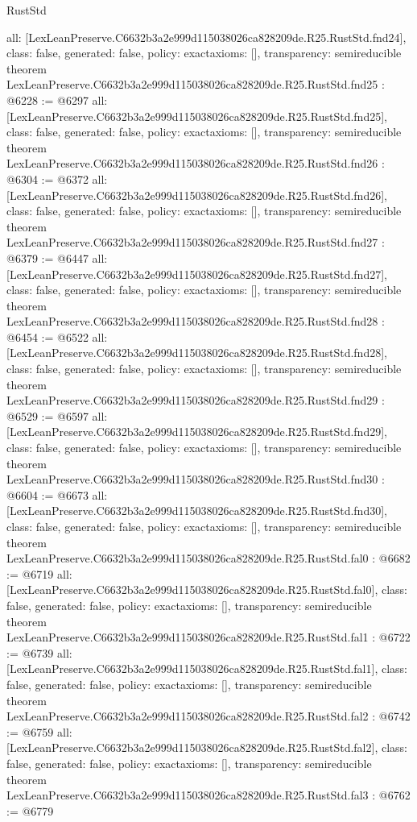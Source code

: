 \begin{lexlean}{RustStd}
\begin{coremodule}
{  all: [LexLeanPreserve.C6632b3a2e999d115038026ca828209de.R25.RustStd.fnd24],
  class: false,
  generated: false,
  policy: exact{axioms: []},
  transparency: semireducible
}
theorem LexLeanPreserve.C6632b3a2e999d115038026ca828209de.R25.RustStd.fnd25 : @6228 := @6297 {
  all: [LexLeanPreserve.C6632b3a2e999d115038026ca828209de.R25.RustStd.fnd25],
  class: false,
  generated: false,
  policy: exact{axioms: []},
  transparency: semireducible
}
theorem LexLeanPreserve.C6632b3a2e999d115038026ca828209de.R25.RustStd.fnd26 : @6304 := @6372 {
  all: [LexLeanPreserve.C6632b3a2e999d115038026ca828209de.R25.RustStd.fnd26],
  class: false,
  generated: false,
  policy: exact{axioms: []},
  transparency: semireducible
}
theorem LexLeanPreserve.C6632b3a2e999d115038026ca828209de.R25.RustStd.fnd27 : @6379 := @6447 {
  all: [LexLeanPreserve.C6632b3a2e999d115038026ca828209de.R25.RustStd.fnd27],
  class: false,
  generated: false,
  policy: exact{axioms: []},
  transparency: semireducible
}
theorem LexLeanPreserve.C6632b3a2e999d115038026ca828209de.R25.RustStd.fnd28 : @6454 := @6522 {
  all: [LexLeanPreserve.C6632b3a2e999d115038026ca828209de.R25.RustStd.fnd28],
  class: false,
  generated: false,
  policy: exact{axioms: []},
  transparency: semireducible
}
theorem LexLeanPreserve.C6632b3a2e999d115038026ca828209de.R25.RustStd.fnd29 : @6529 := @6597 {
  all: [LexLeanPreserve.C6632b3a2e999d115038026ca828209de.R25.RustStd.fnd29],
  class: false,
  generated: false,
  policy: exact{axioms: []},
  transparency: semireducible
}
theorem LexLeanPreserve.C6632b3a2e999d115038026ca828209de.R25.RustStd.fnd30 : @6604 := @6673 {
  all: [LexLeanPreserve.C6632b3a2e999d115038026ca828209de.R25.RustStd.fnd30],
  class: false,
  generated: false,
  policy: exact{axioms: []},
  transparency: semireducible
}
theorem LexLeanPreserve.C6632b3a2e999d115038026ca828209de.R25.RustStd.fal0 : @6682 := @6719 {
  all: [LexLeanPreserve.C6632b3a2e999d115038026ca828209de.R25.RustStd.fal0],
  class: false,
  generated: false,
  policy: exact{axioms: []},
  transparency: semireducible
}
theorem LexLeanPreserve.C6632b3a2e999d115038026ca828209de.R25.RustStd.fal1 : @6722 := @6739 {
  all: [LexLeanPreserve.C6632b3a2e999d115038026ca828209de.R25.RustStd.fal1],
  class: false,
  generated: false,
  policy: exact{axioms: []},
  transparency: semireducible
}
theorem LexLeanPreserve.C6632b3a2e999d115038026ca828209de.R25.RustStd.fal2 : @6742 := @6759 {
  all: [LexLeanPreserve.C6632b3a2e999d115038026ca828209de.R25.RustStd.fal2],
  class: false,
  generated: false,
  policy: exact{axioms: []},
  transparency: semireducible
}
theorem LexLeanPreserve.C6632b3a2e999d115038026ca828209de.R25.RustStd.fal3 : @6762 := @6779 {
}
\end{coremodule}
\end{lexlean}
